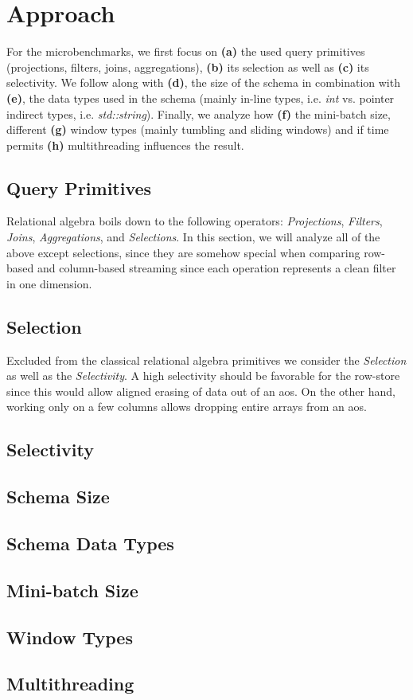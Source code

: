 \section{Approach}
\label{sec:approach}

For the microbenchmarks, we first focus on \textbf{(a)} the used query primitives (projections, filters, joins, aggregations), \textbf{(b)} its selection as well as \textbf{(c)} its selectivity.
We follow along with \textbf{(d)}, the size of the schema in combination with \textbf{(e)}, the data types used in the schema (mainly in-line types, i.e. \emph{int} vs. pointer indirect types, i.e. \emph{std::string}).
Finally, we analyze how \textbf{(f)} the mini-batch size, different \textbf{(g)} window types (mainly tumbling and sliding windows) and if time permits \textbf{(h)} multithreading influences the result.

\subsection{Query Primitives}
Relational algebra boils down to the following operators: \emph{Projections}, \emph{Filters}, \emph{Joins}, \emph{Aggregations}, and \emph{Selections}.
In this section, we will analyze all of the above except selections, since they are somehow special when comparing row-based and column-based streaming since each operation represents a clean filter in one dimension.

\subsection{Selection}
Excluded from the classical relational algebra primitives we consider the \emph{Selection} as well as the \emph{Selectivity}.
A high selectivity should be favorable for the row-store since this would allow aligned erasing of data out of an \ac{aos}.
On the other hand, working only on a few columns allows dropping entire arrays from an \ac{aos}.

\subsection{Selectivity}

\subsection{Schema Size}

\subsection{Schema Data Types}

\subsection{Mini-batch Size}

\subsection{Window Types}

\subsection{Multithreading}
